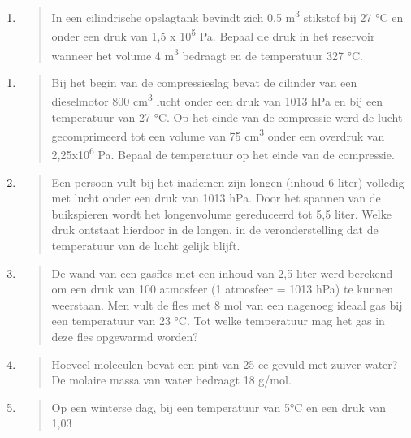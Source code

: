 \documentclass[]{article}
\begin{document}
\begin{enumerate}
\def\labelenumi{\arabic{enumi}.}
\setcounter{enumi}{6}
\item
  \begin{quote}
  In een cilindrische opslagtank bevindt zich 0,5 m\textsuperscript{3}
  stikstof bij 27 °C en onder een druk van 1,5 x 10\textsuperscript{5}
  Pa. Bepaal de druk in het reservoir wanneer het volume 4
  m\textsuperscript{3} bedraagt en de temperatuur 327 °C.
  \end{quote}
\end{enumerate}

\begin{enumerate}
\def\labelenumi{\arabic{enumi}.}
\setcounter{enumi}{6}
\item
  \begin{quote}
  Bij het begin van de compressieslag bevat de cilinder van een
  dieselmotor 800 cm\textsuperscript{3} lucht onder een druk van 1013
  hPa en bij een temperatuur van 27 °C. Op het einde van de compressie
  werd de lucht gecomprimeerd tot een volume van 75
  cm\textsuperscript{3} onder een overdruk van
  2,25x10\textsuperscript{6} Pa. Bepaal de temperatuur op het einde van
  de compressie.
  \end{quote}
\item
  \begin{quote}
  Een persoon vult bij het inademen zijn longen (inhoud 6 liter)
  volledig met lucht onder een druk van 1013 hPa. Door het spannen van
  de buikspieren wordt het longenvolume gereduceerd tot 5,5 liter. Welke
  druk ontstaat hierdoor in de longen, in de veronderstelling dat de
  temperatuur van de lucht gelijk blijft.
  \end{quote}
\item
  \begin{quote}
  De wand van een gasfles met een inhoud van 2,5 liter werd berekend om
  een druk van 100 atmosfeer (1 atmosfeer = 1013 hPa) te kunnen
  weerstaan. Men vult de fles met 8 mol van een nagenoeg ideaal gas bij
  een temperatuur van 23 °C. Tot welke temperatuur mag het gas in deze
  fles opgewarmd worden?
  \end{quote}
\item
  \begin{quote}
  Hoeveel moleculen bevat een pint van 25 cc gevuld met zuiver water? De
  molaire massa van water bedraagt 18 g/mol.
  \end{quote}
\item
  \begin{quote}
  Op een winterse dag, bij een temperatuur van 5°C en een druk van 1,03

\end{quote}
\end{enumerate}
\end{document}
